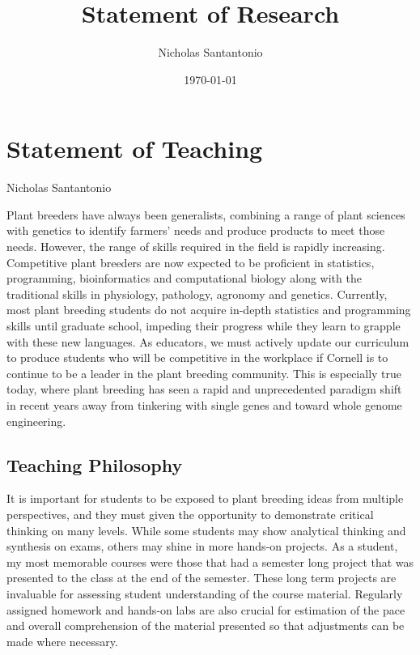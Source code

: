 \documentclass[10pt]{article}
\title{Statement of Research}
\author{Nicholas Santantonio}
\date{\today}
\begin{document}
\section*{\centering Statement of Teaching}
\begin{center} Nicholas Santantonio \end{center}

\noindent Plant breeders have always been generalists, combining a range of plant sciences with genetics to identify farmers' needs and produce products to meet those needs. However, the range of skills required in the field is rapidly increasing. Competitive plant breeders are now expected to be proficient in statistics, programming, bioinformatics and computational biology along with the traditional skills in physiology, pathology, agronomy and genetics. Currently, most plant breeding students do not acquire in-depth statistics and programming skills until graduate school, impeding their progress while they learn to grapple with these new languages. As educators, we must actively update our curriculum to produce students who will be competitive in the workplace if Cornell is to continue to be a leader in the plant breeding community. This is especially true today, where plant breeding has seen a rapid and unprecedented paradigm shift in recent years away from tinkering with single genes and toward whole genome engineering.



\subsection*{Teaching Philosophy}

It is important for students to be exposed to plant breeding ideas from multiple perspectives, and they must given the opportunity to demonstrate critical thinking on many levels. While some students may show analytical thinking and synthesis on exams, others may shine in more hands-on projects. As a student, my most memorable courses were those that had a semester long project that was presented to the class at the end of the semester. These long term projects are invaluable for assessing student understanding of the course material. Regularly assigned homework and hands-on labs are also crucial for estimation of the pace and overall comprehension of the material presented so that adjustments can be made where necessary. 
\end{document}

